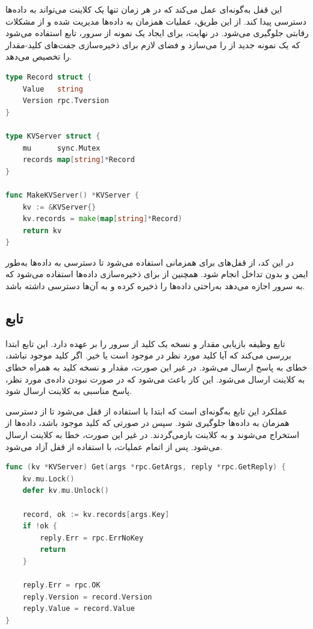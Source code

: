 این قفل به‌گونه‌ای عمل می‌کند که در هر زمان تنها یک کلاینت می‌تواند به داده‌ها دسترسی پیدا کند. از این طریق، عملیات همزمان به داده‌ها مدیریت شده و از مشکلات رقابتی جلوگیری می‌شود. در نهایت، برای ایجاد یک نمونه از سرور، تابع  استفاده می‌شود که یک نمونه جدید از  را می‌سازد و فضای لازم برای ذخیره‌سازی جفت‌های کلید-مقدار را تخصیص می‌دهد.

\begin{latin}
\begin{lstlisting}[language=Go]
type Record struct {
    Value   string
    Version rpc.Tversion
}

type KVServer struct {
    mu      sync.Mutex
    records map[string]*Record
}

func MakeKVServer() *KVServer {
    kv := &KVServer{}
    kv.records = make(map[string]*Record)
    return kv
}
\end{lstlisting}
\end{latin}

در این کد، از قفل‌های  برای همزمانی استفاده می‌شود تا دسترسی به داده‌ها به‌طور ایمن و بدون تداخل انجام شود. همچنین از  برای ذخیره‌سازی داده‌ها استفاده می‌شود که به سرور اجازه می‌دهد به‌راحتی داده‌ها را ذخیره کرده و به آن‌ها دسترسی داشته باشد.

\subsection*{تابع }

تابع  وظیفه بازیابی مقدار و نسخه یک کلید از سرور را بر عهده دارد. این تابع ابتدا بررسی می‌کند که آیا کلید مورد نظر در  موجود است یا خیر. اگر کلید موجود نباشد، خطای  به پاسخ ارسال می‌شود. در غیر این صورت، مقدار و نسخه کلید به همراه خطای  به کلاینت ارسال می‌شود. این کار باعث می‌شود که در صورت نبودن داده‌ی مورد نظر، پاسخ مناسبی به کلاینت ارسال شود.

عملکرد این تابع به‌گونه‌ای است که ابتدا با استفاده از  قفل می‌شود تا از دسترسی همزمان به داده‌ها جلوگیری شود. سپس در صورتی که کلید موجود باشد، داده‌ها از  استخراج می‌شوند و به کلاینت بازمی‌گردند. در غیر این صورت، خطا  به کلاینت ارسال می‌شود. پس از اتمام عملیات، با استفاده از  قفل آزاد می‌شود.

\begin{latin}
\begin{lstlisting}[language=Go]
func (kv *KVServer) Get(args *rpc.GetArgs, reply *rpc.GetReply) {
    kv.mu.Lock()
    defer kv.mu.Unlock()

    record, ok := kv.records[args.Key]
    if !ok {
        reply.Err = rpc.ErrNoKey
        return
    }

    reply.Err = rpc.OK
    reply.Version = record.Version
    reply.Value = record.Value
}
\end{lstlisting}
\end{latin}

